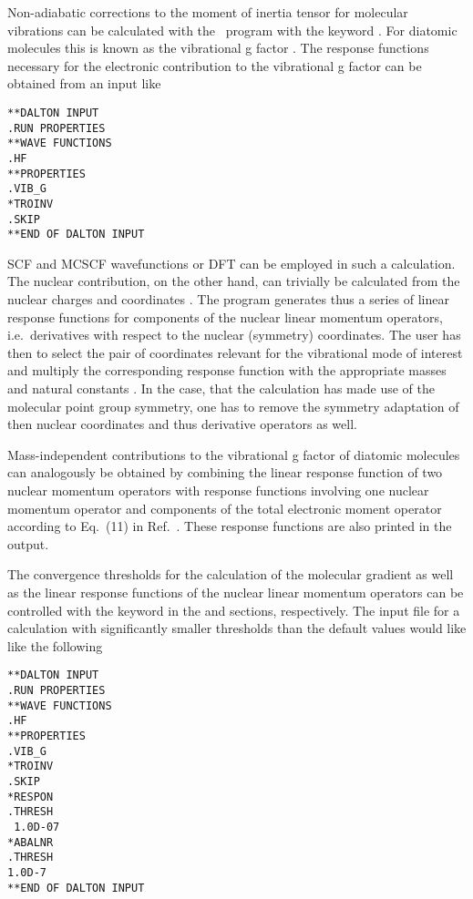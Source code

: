 Non-adiabatic corrections to the moment of inertia tensor for molecular
vibrations can be calculated with the \dalton\ program with the keyword
. For diatomic molecules this is known
as the vibrational g factor \cite{rv66ha,jfo98ho,spas063}.
 The response functions necessary for the
electronic contribution to the vibrational g factor can be obtained
from an input like


\begin{verbatim}
**DALTON INPUT
.RUN PROPERTIES
**WAVE FUNCTIONS
.HF
**PROPERTIES
.VIB_G
*TROINV
.SKIP
**END OF DALTON INPUT
\end{verbatim}

SCF and MCSCF wavefunctions or DFT can be employed in such a
calculation. The nuclear contribution, on the other hand, can trivially
be calculated from the nuclear charges and coordinates
\cite{spas063,spas084}. The program generates thus a series of linear
response functions for components of the nuclear linear momentum
operators, i.e.\ derivatives with respect to the nuclear (symmetry)
coordinates. The user has then to select the pair of coordinates
relevant for the vibrational mode of interest and multiply the
corresponding response function with the appropriate masses and natural
constants \cite{spas063,spas084}. In the case, that the calculation has
made use of the molecular point group symmetry, one has to remove the
symmetry adaptation of then nuclear coordinates and thus derivative
operators as well.

Mass-independent contributions to the vibrational g factor of diatomic
molecules can analogously be obtained by combining the linear response
function of two nuclear momentum operators with response functions
involving one nuclear momentum operator and components of the total
electronic moment operator according to Eq.~(11) in Ref.~\cite{spas084}.
 These response functions are also printed in the
output.

The convergence thresholds for the calculation of the molecular gradient as
well as the linear response functions of the nuclear linear momentum operators
can be controlled with the  keyword in the  and
 sections, respectively. The input file for a calculation with
significantly smaller thresholds than the default values would like like the
following

\begin{verbatim}
**DALTON INPUT
.RUN PROPERTIES
**WAVE FUNCTIONS
.HF
**PROPERTIES
.VIB_G
*TROINV
.SKIP
*RESPON
.THRESH
 1.0D-07
*ABALNR
.THRESH
1.0D-7
**END OF DALTON INPUT
\end{verbatim}

